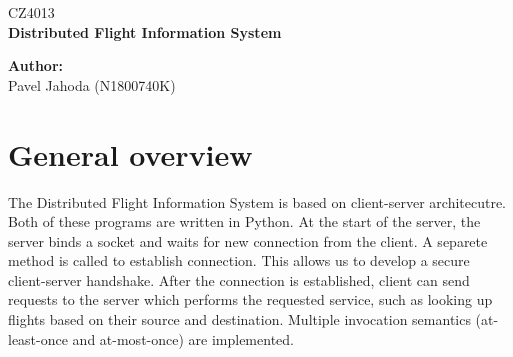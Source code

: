 \documentclass[12pt,a4paper]{article}
\begin{document}
\begin{titlepage}
  \thispagestyle{fancy}

  \vspace*{\fill}
  \begin{center}
    {\fontsize{20}{30}\selectfont CZ4013}\\[1cm]
    {\fontsize{30}{100}\selectfont \textbf{Distributed Flight Information System}}\\[4.2cm]
  \end{center}

  \vspace*{\fill}

  {\fontsize{10}{10} \selectfont \noindent
  \textbf{Author:}\\
  Pavel Jahoda (N1800740K)
  }
\end{titlepage}

\renewcommand{\headrulewidth}{0.4pt}
\renewcommand{\footrulewidth}{0.4pt}


\tableofcontents

\newpage


\section{General overview}
The Distributed Flight Information System is based on client-server architecutre. Both of these programs are written in Python. At the start of the server, the server binds a socket and waits for new connection from the client. A separete method is called to establish connection. This allows us to develop a secure client-server handshake. After the connection is established, client can send requests to the server which performs the requested service, such as looking up flights based on their source and destination. Multiple invocation semantics (at-least-once and at-most-once) are implemented.
\end{document}
